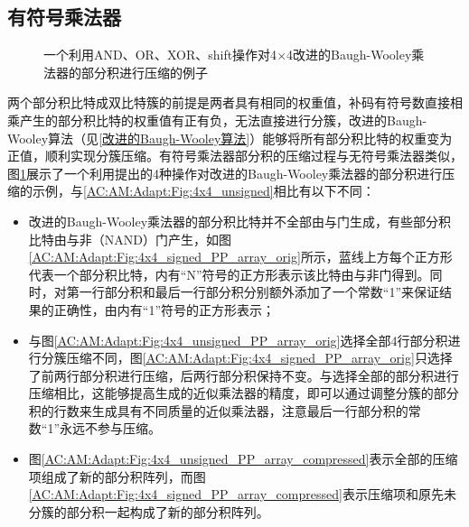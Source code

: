 \subsection{有符号乘法器}

\begin{figure}[ht]
    \centering
    \caption{一个利用AND、OR、XOR、shift操作对4$\times$4改进的Baugh-Wooley乘法器的部分积进行压缩的例子}
    \label{AC:AM:Adapt:Fig:4x4_signed}
\end{figure}

两个部分积比特成双比特簇的前提是两者具有相同的权重值，补码有符号数直接相乘产生的部分积比特的权重值有正有负，无法直接进行分簇，改进的Baugh-Wooley算法\cite{EM:baugh-wooley,EM:baugh-wooley_modified_PP_reorga,EM:baugh-wooley_diff}（见\ref{改进的Baugh-Wooley算法}）能够将所有部分积比特的权重变为正值，顺利实现分簇压缩。有符号乘法器部分积的压缩过程与无符号乘法器类似，图\ref{AC:AM:Adapt:Fig:4x4_signed}展示了一个利用提出的4种操作对改进的Baugh-Wooley乘法器的部分积进行压缩的示例，与\ref{AC:AM:Adapt:Fig:4x4_unsigned}相比有以下不同：
\begin{itemize}
    \item 改进的Baugh-Wooley乘法器的部分积比特并不全部由与门生成，有些部分积比特由与非（NAND）门产生，如图\ref{AC:AM:Adapt:Fig:4x4_signed_PP_array_orig}所示，蓝线上方每个正方形代表一个部分积比特，内有“N”符号的正方形表示该比特由与非门得到。同时，对第一行部分积和最后一行部分积分别额外添加了一个常数“1”来保证结果的正确性，由内有“1”符号的正方形表示；
    \item 与图\ref{AC:AM:Adapt:Fig:4x4_unsigned_PP_array_orig}选择全部4行部分积进行分簇压缩不同，图\ref{AC:AM:Adapt:Fig:4x4_signed_PP_array_orig}只选择了前两行部分积进行压缩，后两行部分积保持不变。与选择全部的部分积进行压缩相比，这能够提高生成的近似乘法器的精度，即可以通过调整分簇的部分积的行数来生成具有不同质量的近似乘法器，注意最后一行部分积的常数“1”永远不参与压缩。
    \item 图\ref{AC:AM:Adapt:Fig:4x4_unsigned_PP_array_compressed}表示全部的压缩项组成了新的部分积阵列，而图\ref{AC:AM:Adapt:Fig:4x4_signed_PP_array_compressed}表示压缩项和原先未分簇的部分积一起构成了新的部分积阵列。
\end{itemize}

